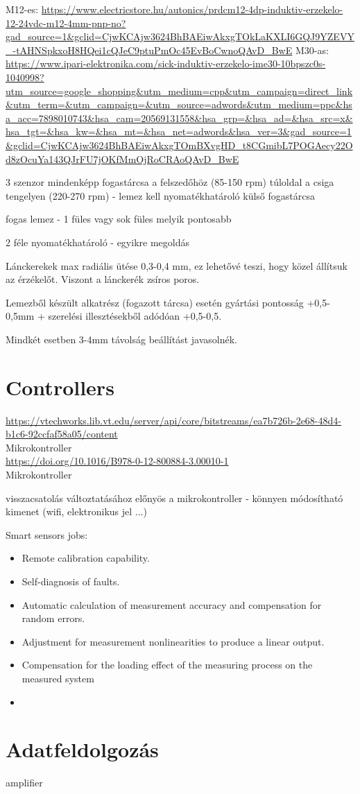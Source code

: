 \documentclass{article}
\begin{document}
	M12-es: \url{https://www.electricstore.hu/autonics/prdcm12-4dp-induktiv-erzekelo-12-24vdc-m12-4mm-pnp-no?gad_source=1&gclid=CjwKCAjw3624BhBAEiwAkxgTOkLaKXLI6GQJ9YZEVY_-tAHNSpkxoH8HQei1cQJeC9ptuPmOc45EvBoCwnoQAvD_BwE}
	M30-as: \url{https://www.ipari-elektronika.com/sick-induktiv-erzekelo-ime30-10bpszc0s-1040998?utm_source=google_shopping&utm_medium=cpp&utm_campaign=direct_link&utm_term=&utm_campaign=&utm_source=adwords&utm_medium=ppc&hsa_acc=7898010743&hsa_cam=20569131558&hsa_grp=&hsa_ad=&hsa_src=x&hsa_tgt=&hsa_kw=&hsa_mt=&hsa_net=adwords&hsa_ver=3&gad_source=1&gclid=CjwKCAjw3624BhBAEiwAkxgTOmBXvgHD_t8CGmibL7POGAecy22Od8zOcuYa143QJrFU7jOKfMmOjRoCRAoQAvD_BwE}
	
	
	3 szenzor mindenképp
	fogastárcsa a felszedőhöz (85-150 rpm)
	túloldal a csiga tengelyen (220-270 rpm) - lemez kell
	nyomatékhatároló külső fogastárcsa
	
	fogas lemez - 1 füles vagy sok füles melyik pontosabb
	
	2 féle nyomatékhatároló - egyikre megoldás
	
	Lánckerekek max radiális ütése 0,3-0,4 mm, ez lehetővé teszi, hogy közel állítsuk az érzékelőt. Viszont a lánckerék zsíros poros.
	
	Lemezből készült alkatrész (fogazott tárcsa) esetén gyártási pontosság +0,5-0,5mm + szerelési illesztésekből adódóan +0,5-0,5.
	
	Mindkét esetben 3-4mm távolság beállítást javasolnék. 
	
	
	\section{Controllers}
	
	\url{https://vtechworks.lib.vt.edu/server/api/core/bitstreams/ea7b726b-2e68-48d4-b1c6-92ccfaf58a05/content}\\
	Mikrokontroller\\
	\url{https://doi.org/10.1016/B978-0-12-800884-3.00010-1}\\
	Mikrokontroller
	
	
	visszacsatolás változtatásához előnyös a mikrokontroller - könnyen módosítható kimenet (wifi, elektronikus jel ...)
	
	Smart sensors jobs:
	\begin{itemize}
		\item Remote calibration capability.
		\item Self-diagnosis of faults.
		\item Automatic calculation of measurement accuracy and compensation for random errors.
		\item Adjustment for measurement nonlinearities to produce a linear output.
		\item Compensation for the loading effect of the measuring process on the measured system
		\item 
	\end{itemize}
	
	
	
	
	
	
	\section{Adatfeldolgozás}
	
	amplifier
	
	
\end{document}
